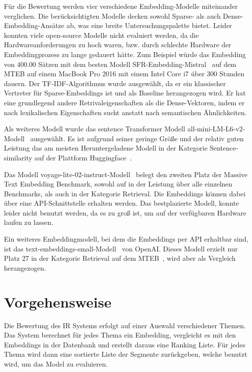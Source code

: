 Für die Bewertung werden vier verschiedene Embedding-Modelle miteinander verglichen.
Die berücksichtigten Modelle decken sowohl Sparse- als auch Dense-Embedding-Ansätze ab, was eine breite Untersuchungspalette bietet.
Leider konnten viele open-source Modelle nicht evaluiert werden, da die Hardwareanforderungen zu hoch waren, bzw. durch schlechte Hardware der Embeddingprozess zu lange gedauert hätte. 
Zum Beispiel würde das Embedding von 400.00 Sätzen mit dem besten Modell SFR-Embedding-Mistral~\cite{zotero-576} auf dem MTEB auf einem MacBook Pro 2016 mit einem Intel Core i7 über 300 Stunden dauern.
Der TF-IDF-Algorithmus wurde ausgewählt, da er ein klassischer Vertreter für Sparse-Embeddings ist und als Baseline herangezogen wird. 
Er hat eine grundlegend andere Retrivaleigenschaften als die Dense-Vektoren, indem er nach lexikalischen Eigenschaften sucht anstatt nach semantischen Ähnlichkeiten.


Als weiteres Modell wurde das sentence Transformer Modell all-mini-LM-L6-v2-Modell~\cite{minilm2024} ausgewählt.
Es ist aufgrund seiner geringe Größe und der relativ guten Leistung das am meisten Heruntergeladene Modell in der Kategorie Sentence-similarity auf der Plattform Huggingface~\cite{2024}.

Das Modell voyage-lite-02-instruct-Modell~\cite{zotero-572} belegt den zweiten Platz der Massive Text Embedding Benchmark, sowohl auf in der Leistung über alle einzelnen Benchmarks, als auch in der Kategorie Retrieval.
Die Embeddings können dabei über eine API-Schnittstelle erhalten werden.
Das bestplazierte Modell, konnte leider nicht benutzt werden, da es zu groß ist, um auf der verfügbaren Hardware laufen zu lassen.


Ein weiteres Embeddingmodell, bei dem die Embeddings per API erhaltbar sind, ist das text-embeddings-small-Modell~\cite{zotero-574} von OpenAI.
Dieses Modell erzielt nur Platz 27 in der Kategorie Retrieval auf dem MTEB~\cite{mteb}, wird aber als Vergleich herangezogen.


\section*{Vorgehensweise}

Die Bewertung des IR Systems erfolgt auf einer Auswahl verschiedener Themen.
Das System berechnet für jedes Thema ein Embedding, vergleicht es mit den Embeddings in der Datenbank und erstellt daraus eine Ranking Liste.
Für jedes Thema wird dann eine sortierte Liste der Segmente zurückgeben, welche benutzt wird, um das Model zu evaluieren.

